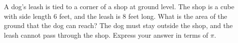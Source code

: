 A dog's leash is tied to a corner of a shop at ground level. The shop is a cube with side length $6$ feet, and the leash is $8$ feet long. What is the area of the ground that the dog can reach? The dog must stay outside the shop, and the leash cannot pass through the shop. Express your answer in terms of $\pi$.
